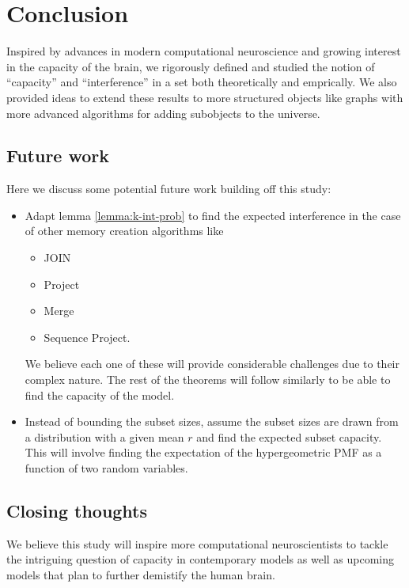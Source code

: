 \chapter{Conclusion}

Inspired by advances in modern computational neuroscience and growing interest in the capacity of the brain, we rigorously defined and studied the notion of ``capacity'' and ``interference'' in a set both theoretically and emprically. We also provided ideas to extend these results to more structured objects like graphs with more advanced algorithms for adding subobjects to the universe.

\section{Future work}

Here we discuss some potential future work building off this study:

\begin{itemize}
    \item Adapt lemma \ref{lemma:k-int-prob} to find the expected interference in the case of other memory creation algorithms like \begin{itemize}
        \item JOIN
        \item Project
        \item Merge
        \item Sequence Project. 
    \end{itemize}
    We believe each one of these will provide considerable challenges due to their complex nature. The rest of the theorems will follow similarly to be able to find the capacity of the model.
    \item Instead of bounding the subset sizes, assume the subset sizes are drawn from a distribution with a given mean $r$ and find the expected subset capacity. This will involve finding the expectation of the hypergeometric PMF as a function of two random variables. 
\end{itemize}

\section{Closing thoughts}

We believe this study will inspire more computational neuroscientists to tackle the intriguing question of capacity in contemporary models as well as upcoming models that plan to further demistify the human brain. 
